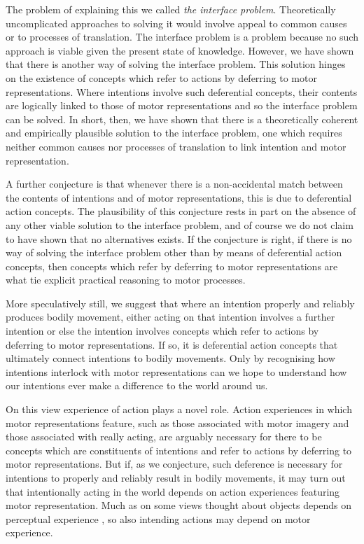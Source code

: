 \documentclass[12pt,\papersize]{extarticle}
\begin{document}
The problem of explaining this we called \emph{the interface problem}. Theoretically uncomplicated approaches to solving it would involve appeal to common causes or to processes of translation. The interface problem is a problem because no such approach is viable given the present state of knowledge. However, we have shown that there is another way of solving the interface problem. This solution hinges on the existence of concepts which refer to actions by deferring to motor representations. Where intentions involve such deferential concepts, their contents are logically linked to those of motor representations and so the interface problem can be solved. In short, then, we have shown that there is a theoretically coherent and empirically plausible solution to the interface problem, one which requires neither common causes nor processes of translation to link intention and motor representation.

A further conjecture is that whenever there is a non-accidental match between the contents of intentions and of motor representations, this is due to deferential action concepts. The plausibility of this conjecture rests in part on the absence of any other viable solution to the interface problem, and of course we do not claim to have shown that no alternatives exists. If the conjecture is right, if there is no way of solving the interface problem other than by means of deferential action concepts, then concepts which refer by deferring to motor representations are what tie explicit practical reasoning to motor processes.

More speculatively still, we suggest that where an intention properly and reliably produces bodily movement, either acting on that intention involves a further intention or else the intention involves concepts which refer to actions by deferring to motor representations. If so, it is deferential action concepts that ultimately connect intentions to bodily movements. Only by recognising how intentions interlock with motor representations can we hope to understand how our intentions ever make a difference to the world around us.

On this view experience of action plays a novel role. Action experiences in which motor representations feature, such as those associated with motor imagery and those associated with really acting, are arguably necessary for there to be concepts which are constituents of intentions and refer to actions by deferring to motor representations. But if, as we conjecture, such deference is necessary for intentions to properly and reliably result in bodily movements, it may turn out that intentionally acting in the world depends on action experiences featuring motor representation. Much as on some views thought about objects depends on perceptual experience \citep[e.g.][]{Campbell:2002ge}, so also intending actions may depend on motor experience.  







\end{document}
